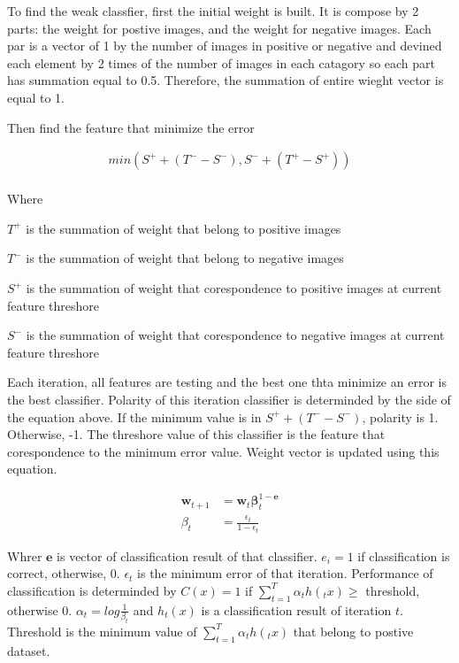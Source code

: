 \documentclass[11pt]{article}
\begin{document}
To find the weak classfier, first the initial weight is built. It is compose by 2 parts: the weight for postive images, and the weight for negative images. Each par is a vector of 1 by the number of images in positive or negative and devined each element by 2 times of the number of images in each catagory so each part has summation equal to 0.5. Therefore, the summation of entire wieght vector is equal to 1. 

Then find the feature that minimize the error 

\begin{align*}
min(S^+ + (T^- - S^-), S^- + (T^+ - S^+)) \\
\end{align*}

Where

$T^+$ is the summation of weight that belong to positive images

$T^-$ is the summation of weight that belong to negative images

$S^+$ is the summation of weight that corespondence to positive images at current feature threshore

$S^-$ is the summation of weight that corespondence to negative images at current feature threshore

Each iteration, all features are testing and the best one thta minimize an error is the best classifier. Polarity of this iteration classifier is determinded by the side of the equation above. If the minimum value is in $S^+ + (T^- - S^-)$, polarity is 1. Otherwise, -1. The threshore value of this classifier is the feature that corespondence to the minimum error value. Weight vector is updated using this equation.

\begin{align*}
\mathbf{w}_{t+1} &=  \mathbf{w}_{t}\mathbf{\beta}_t^{1-\mathbf{e}} \\
\beta_t &= \frac{\epsilon_t}{1-\epsilon_t}
\end{align*}

Whrer $\mathbf{e}$ is vector of classification result of that classifier. $e_i = 1$  if classification is correct, otherwise, 0. $\epsilon_t$ is the minimum error of that iteration. Performance of classification is determinded by $C(x) = 1$ if $\sum_{t=1}^T \alpha_t h(_tx) \geq$ threshold, otherwise 0. $\alpha_t = log \frac{1}{\beta_t}$ and $h_t(x)$ is a classification result of iteration $t$. Threshold is the minimum value of $\sum_{t=1}^T \alpha_t h(_tx)$ that belong to postive dataset. 
\end{document}
